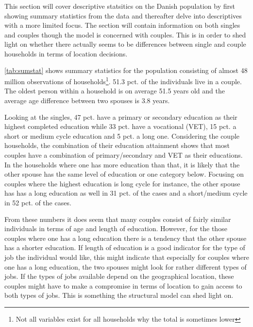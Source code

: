 This section will cover descriptive statsitics on the Danish population by first showing summary statistics from the data and thereafter delve into descriptives with a more limited focus. The section will contain information on both singles and couples though the model is concerned with couples. This is in order to shed light on whether there actually seems to be differences between single and couple households in terms of location decisions.

\autoref{tab:sumstat} shows summary statistics for the population consisting of almost 48 million observations of households\footnote{Not all variables exist for all households why the total is sometimes lower}. 51.3 pct. of the individuals live in a couple. The oldest person within a household is on average 51.5 years old and the average age difference between two spouses is 3.8 years. 

Looking at the singles, 47 pct. have a primary or secondary education as their highest completed education while 33 pct. have a vocational (VET), 15 pct. a short or medium cycle education and 5 pct. a long one. Considering the couple households, the combination of their education attainment shows that most couples have a combination of primary/secondary and VET as their educations. In the households where one has more education than that, it is likely that the other spouse has the same level of education or one category below. Focusing on couples where the highest education is long cycle for instance, the other spouse has has a long education as well in 31 pct. of the cases and a short/medium cycle in 52 pct. of the cases.

From these numbers it does seem that many couples consist of fairly similar individuals in terms of age and length of education. However, for the those couples where one has a long education there is a tendency that the other spouse has a shorter education. If length of education is a good indicator for the type of job the individual would like, this might indicate that especially for couples where one has a long education, the two spouses might look for rather different types of jobs. If the types of jobs available depend on the geographical location, these couples might have to make a compromise in terms of location to gain access to both types of jobs. This is something the structural model can shed light on.


